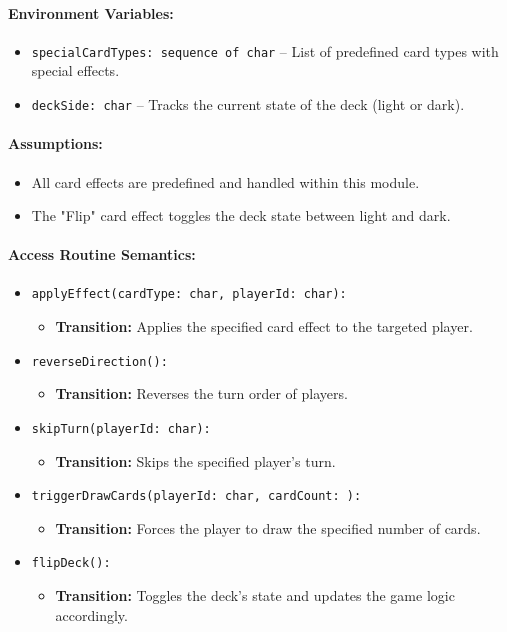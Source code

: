 \documentclass[12pt, titlepage]{article}
\begin{document}
\paragraph{Environment Variables:}
\begin{itemize}
    \item \texttt{specialCardTypes: sequence of char} -- List of predefined card types with special effects.
    \item \texttt{deckSide: char} -- Tracks the current state of the deck (light or dark).
\end{itemize}

\paragraph{Assumptions:}
\begin{itemize}
    \item All card effects are predefined and handled within this module.
    \item The "Flip" card effect toggles the deck state between light and dark.
\end{itemize}

\paragraph{Access Routine Semantics:}
\begin{itemize}
    \item \texttt{applyEffect(cardType: char, playerId: char):}
    \begin{itemize}
        \item \textbf{Transition:} Applies the specified card effect to the targeted player.
    \end{itemize}
    \item \texttt{reverseDirection():}
    \begin{itemize}
        \item \textbf{Transition:} Reverses the turn order of players.
    \end{itemize}
    \item \texttt{skipTurn(playerId: char):}
    \begin{itemize}
        \item \textbf{Transition:} Skips the specified player's turn.
    \end{itemize}
    \item \texttt{triggerDrawCards(playerId: char, cardCount: ):}
    \begin{itemize}
        \item \textbf{Transition:} Forces the player to draw the specified number of cards.
    \end{itemize}
    \item \texttt{flipDeck():}
    \begin{itemize}
        \item \textbf{Transition:} Toggles the deck's state and updates the game logic accordingly.
    \end{itemize}
\end{itemize}
\end{document}
